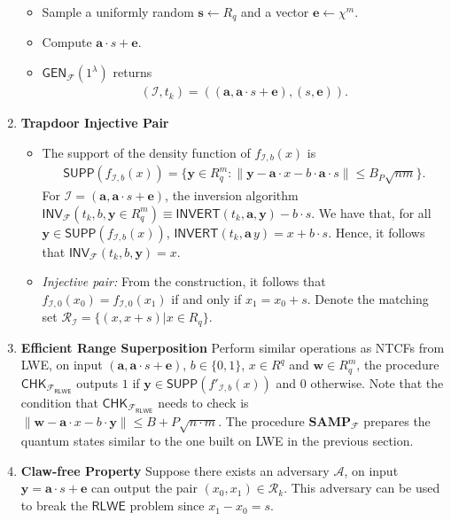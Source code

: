 \documentclass[cryptography,review,submit,pdftex,moreauthors,amsmath,amssymb,aps,strict]{Definitions/mdpi}
\begin{document}
\begin{Definition}
\begin{enumerate}
\begin{itemize}
        \item Sample a uniformly random $\mathbf{s}\gets R_q$ and a vector $\mathbf{e}\gets \chi^m$.
        \item Compute $\mathbf{a}\cdot s+\mathbf{e}$.
        \item $\mathsf{GEN}_{\mathcal{F}}(1^{\lambda})$ returns \begin{align}
            (\mathcal{I},t_k)=((\mathbf{a},\mathbf{a}\cdot s+\mathbf{e}),(s,\mathbf{e})).
        \end{align}
        \end{itemize}
    \item \textbf{Trapdoor Injective Pair}
        \begin{itemize}
        \item The support of the density function of $f_{\mathcal{I},b}(x)$ is 
        \begin{align}
            \mathsf{SUPP}(f_{\mathcal{I},b}(x))=\{\mathbf{y}\in R_q^m:\|\mathbf{y}- \mathbf{a} \cdot x-b\cdot \mathbf{a} \cdot s\|\leq B_P\sqrt{nm}\}.
        \end{align}
        For $\mathcal{I}=(\mathbf{a},\mathbf{a}\cdot s+\mathbf{e})$, the inversion algorithm $\mathsf{INV}_\mathcal{F}(t_{k},b,\mathbf{y}\in R_q^m) \equiv \mathsf{INVERT}(t_{k},\mathbf{a},\mathbf{y})-b\cdot s$. We have that, for all $\mathbf{y}\in \mathsf{SUPP}(f_{\mathcal{I},b}(x))$, $\mathsf{INVERT}(t_{k},\mathbf{a}\,y)=x+b\cdot s$. Hence, it follows that $\mathsf{INV}_\mathcal{F}(t_{k},b,\mathbf{y})= x$.
        
        \item \textit{Injective pair:} From the construction, it follows that $f_{\mathcal{I},0}(x_0)= f_{\mathcal{I},0}(x_1)$ if and only if $x_1=x_0+s$. Denote the matching set $\mathcal{R}_{\mathcal{I}}=\{(x,x+s)|x\in R_q\}$.
    \end{itemize}
    \item \textbf{Efficient Range Superposition}
    Perform similar operations as NTCFs from LWE, on input $(\mathbf{a},\mathbf{a}\cdot s+\mathbf{e})$, $b\in\{0,1\}$, $x\in R^q$ and $\mathbf{w}\in R^m_q$, the procedure $\mathsf{CHK}_{\mathcal{F}_{\mathsf{RLWE}}}$ outputs $1$ if $\mathbf{y}\in\mathsf{SUPP}(f'_{\mathcal{I},b}(x))$ and $0$ otherwise.
    Note that the condition that $\mathsf{CHK}_{\mathcal{F}_{\mathsf{RLWE}}}$ needs to check is $\|\mathbf{w}-\mathbf{a}\cdot x - b\cdot \mathbf{y}\|\leq B+P\sqrt{n\cdot m}$.
    The procedure $\mathbf{SAMP}_{\mathcal{F}}$ prepares the quantum states similar to the one built on LWE in the previous section.
     
    \item \textbf{Claw-free Property} Suppose there exists an adversary $\mathcal{A}$, on input $\mathbf{y}=\mathbf{a}\cdot s+\mathbf{e}$ can output the pair $(x_0,x_1)\in\mathcal{R}_k$. This adversary can be used to break the $\mathsf{RLWE}$ problem since $x_1-x_0=s$.  
        
    \end{enumerate}
\end{Definition}
\end{document}
